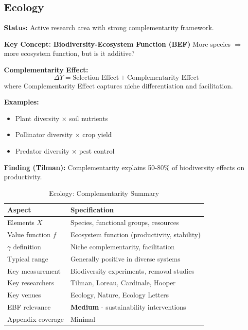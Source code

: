 \subsection{Ecology}
\label{sec:eco}

\begin{tcolorbox}[colback=teal!5!white,colframe=teal!75!black,title=\textbf{Ecology: Biodiversity-Ecosystem Function}]

\textbf{Status:} Active research area with strong complementarity framework.

\textbf{Key Concept: Biodiversity-Ecosystem Function (BEF)}
More species $\Rightarrow$ more ecosystem function, but is it additive?

\textbf{Complementarity Effect:}
\begin{equation}
\Delta Y = \text{Selection Effect} + \text{Complementarity Effect}
\end{equation}
where Complementarity Effect captures niche differentiation and facilitation.

\textbf{Examples:}
\begin{itemize}[noitemsep]
    \item Plant diversity × soil nutrients
    \item Pollinator diversity × crop yield
    \item Predator diversity × pest control
\end{itemize}

\textbf{Finding (Tilman):}
Complementarity explains 50-80\% of biodiversity effects on productivity.

\end{tcolorbox}

\begin{table}[h]
\centering
\caption{Ecology: Complementarity Summary}
\label{tab:eco-summary}
\renewcommand{\arraystretch}{1.3}
\small
\begin{tabular}{@{}ll@{}}
\toprule
\textbf{Aspect} & \textbf{Specification} \\
\midrule
Elements $X$ & Species, functional groups, resources \\
Value function $f$ & Ecosystem function (productivity, stability) \\
$\gamma$ definition & Niche complementarity, facilitation \\
Typical range & Generally positive in diverse systems \\
Key measurement & Biodiversity experiments, removal studies \\
Key researchers & Tilman, Loreau, Cardinale, Hooper \\
Key venues & Ecology, Nature, Ecology Letters \\
EBF relevance & \textbf{Medium} - sustainability interventions \\
Appendix coverage & Minimal \\
\bottomrule
\end{tabular}
\end{table}

